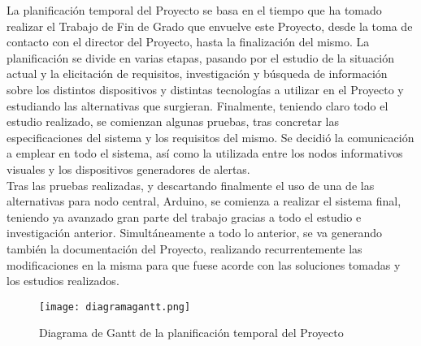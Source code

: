 
La planificación temporal del Proyecto se basa en el tiempo que ha tomado realizar el Trabajo de Fin de Grado que envuelve este Proyecto, desde la toma de contacto con el director del Proyecto, hasta la finalización del mismo. La planificación se divide en varias etapas, pasando por el estudio de la situación actual y la elicitación de requisitos, investigación y búsqueda de información sobre los distintos dispositivos y distintas tecnologías a utilizar en el Proyecto y estudiando las alternativas que surgieran. Finalmente, teniendo claro todo el estudio realizado, se comienzan algunas pruebas, tras concretar las especificaciones del sistema y los requisitos del mismo. Se decidió la comunicación a emplear en todo el sistema, así como la utilizada entre los nodos informativos visuales y los dispositivos generadores de alertas. \\

Tras las pruebas realizadas, y descartando finalmente el uso de una de las alternativas para nodo central, Arduino, se comienza a realizar el sistema final, teniendo ya avanzado gran parte del trabajo gracias a todo el estudio e investigación anterior. Simultáneamente a todo lo anterior, se va generando también la documentación del Proyecto, realizando recurrentemente las modificaciones en la misma para que fuese acorde con las soluciones tomadas y los estudios realizados.

\begin{figure}[!ht]
    \centering
    {\texttt{[image: diagramagantt.png]}}
        \caption{Diagrama de Gantt de la planificación temporal del Proyecto}
        \label{diagramagantt}
\end{figure}

\clearpage